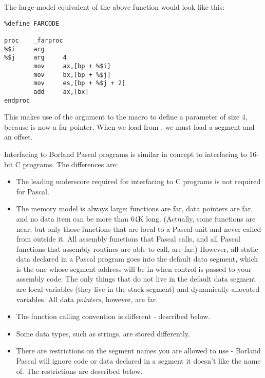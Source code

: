 The large-model equivalent of the above function would look like this:

\begin{lstlisting}
%define FARCODE

proc    _farproc
%$i     arg
%$j     arg     4
        mov     ax,[bp + %$i]
        mov     bx,[bp + %$j]
        mov     es,[bp + %$j + 2]
        add     ax,[bx]
endproc
\end{lstlisting}

This makes use of the argument to the  macro to define a
parameter of size 4, because  is now a far pointer. When we
load from , we must load a segment and an offset.


Interfacing to Borland Pascal programs is similar in concept to
interfacing to 16-bit C programs. The differences are:

\begin{itemize}
    \item{The leading underscore required for interfacing to C programs is
        not required for Pascal.}

    \item{The memory model is always large: functions are far, data
        pointers are far, and no data item can be more than 64K long.
        (Actually, some functions are near, but only those functions that
        are local to a Pascal unit and never called from outside it. All
        assembly functions that Pascal calls, and all Pascal functions that
        assembly routines are able to call, are far.) However, all static
        data declared in a Pascal program goes into the default data
        segment, which is the one whose segment address will be in 
        when control is passed to your assembly code. The only things that
        do not live in the default data segment are local variables (they
        live in the stack segment) and dynamically allocated variables. All
        data \emph{pointers}, however, are far.}

    \item{The function calling convention is different - described below.}

    \item{Some data types, such as strings, are stored differently.}

    \item{There are restrictions on the segment names you are allowed to
        use - Borland Pascal will ignore code or data declared in a segment
        it doesn't like the name of. The restrictions are described below.}
\end{itemize}

